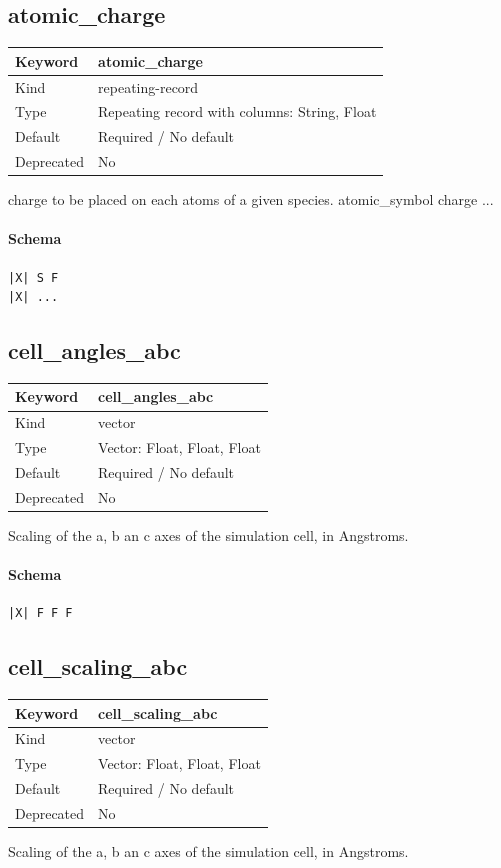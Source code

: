 \documentclass[11pt]{article}
\begin{document}
\subsection{atomic\_charge}
\label{kw:atomic-charge}
\begin{longtable}{|p{1.5in}|p{4.5in}|}
\hline
Keyword & atomic\_charge \\
\hline
Kind & repeating-record \\
\hline
Type & Repeating record with columns: String, Float \\
\hline
Default & Required / No default \\
\hline
Deprecated & No \\
\hline
\end{longtable}
 charge to be placed on each atoms of a given species.
 atomic\_symbol charge
 ...

\paragraph{Schema}
\begin{Verbatim}
|X| S F
|X| ...
\end{Verbatim}

\subsection{cell\_angles\_abc}
\label{kw:cell-angles-abc}
\begin{longtable}{|p{1.5in}|p{4.5in}|}
\hline
Keyword & cell\_angles\_abc \\
\hline
Kind & vector \\
\hline
Type & Vector: Float, Float, Float \\
\hline
Default & Required / No default \\
\hline
Deprecated & No \\
\hline
\end{longtable}
 Scaling of the a, b an c axes of the simulation cell, in Angstroms.

\paragraph{Schema}
\begin{Verbatim}
|X| F F F
\end{Verbatim}

\subsection{cell\_scaling\_abc}
\label{kw:cell-scaling-abc}
\begin{longtable}{|p{1.5in}|p{4.5in}|}
\hline
Keyword & cell\_scaling\_abc \\
\hline
Kind & vector \\
\hline
Type & Vector: Float, Float, Float \\
\hline
Default & Required / No default \\
\hline
Deprecated & No \\
\hline
\end{longtable}
 Scaling of the a, b an c axes of the simulation cell, in Angstroms.
\end{document}
